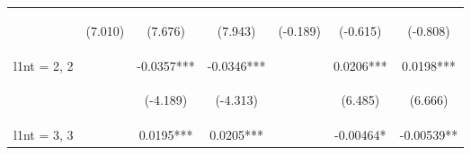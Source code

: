 \documentclass[]{article}
\begin{document}
\begin{center}
\begin{tabular}{lcccccc}
        \vspace{4pt}     & \begin{footnotesize}(7.010)\end{footnotesize}  & \begin{footnotesize}(7.676)\end{footnotesize}  & \begin{footnotesize}(7.943)\end{footnotesize}  & \begin{footnotesize}(-0.189)\end{footnotesize} & \begin{footnotesize}(-0.615)\end{footnotesize} & \begin{footnotesize}(-0.808)\end{footnotesize} \\
        l1nt = 2, 2      &                                                & -0.0357***                                     & -0.0346***                                     &                                                & 0.0206***                                      & 0.0198***                                      \\
        \vspace{4pt}     & \begin{footnotesize}\end{footnotesize}         & \begin{footnotesize}(-4.189)\end{footnotesize} & \begin{footnotesize}(-4.313)\end{footnotesize} & \begin{footnotesize}\end{footnotesize}         & \begin{footnotesize}(6.485)\end{footnotesize}  & \begin{footnotesize}(6.666)\end{footnotesize}  \\
        l1nt = 3, 3      &                                                & 0.0195***                                      & 0.0205***                                      &                                                & -0.00464*                                      & -0.00539**                                     \\

\end{tabular}
\end{center}
\end{document}
